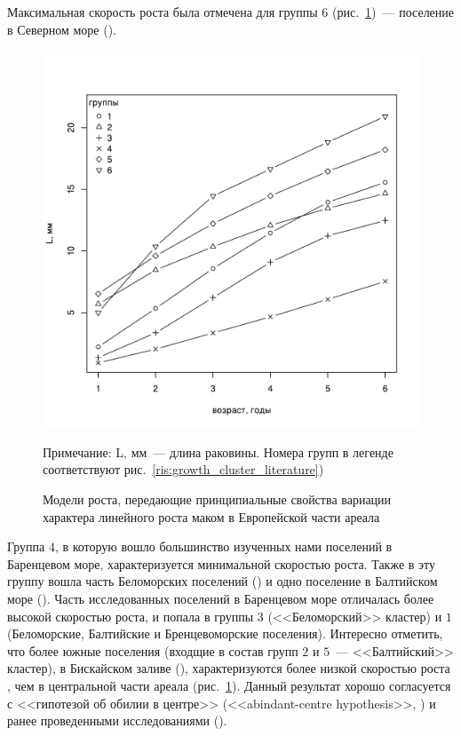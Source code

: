 Максимальная скорость роста была отмечена для группы $6$ (рис.~\ref{ris:growth_model_europe})~--- поселение в Северном море (\cite{Vogel_1959}). 
	\begin{figure}[p]
	\begin{center}	
		\includegraphics[width=\textwidth]{../Growth_sravnenie/Europe_growth_groups1.pdf}
	\end{center}
		\caption{Модели роста, передающие принципиальные свойства вариации характера линейного роста маком в Европейской части ареала}

	\footnotesize{Примечание: L, мм~--- длина раковины. Номера групп в легенде соответствуют рис.~\ref{ris:growth_cluster_literature})}
		\label{ris:growth_model_europe}
	\end{figure}
Группа $4$, в которую вошло большинство изученных нами поселений в Баренцевом море, характеризуется минимальной скоростью роста.
Также в эту группу вошла часть Беломорских поселений (\cite{Semenova_1970}) и одно поселение в Балтийском море (\cite{Bergh_1974}).
Часть исследованных поселений в Баренцевом море отличалась более высокой скоростью роста, и попала в группы $3$ (<<Беломорский>> кластер) и $1$ (Беломорские, Балтийские и Бренцевоморские поселения).
Интересно отметить, что более южные поселения (входщие в состав групп $2$ и $5$~--- <<Балтийский>> кластер), в Бискайском заливе (\cite{Bachelet_1980}), характеризуются более низкой скоростью роста , чем в центральной части ареала (рис.~\ref{ris:growth_model_europe}).
Данный результат хорошо согласуется с <<гипотезой об обилии в центре>> (<<abindant-centre hypothesis>>, \cite{Sagarin_et_al_2006}) и ранее проведенными исследованиями (\cite{Beukema_Meehan_1985, Hummel_et_al_1998}).

